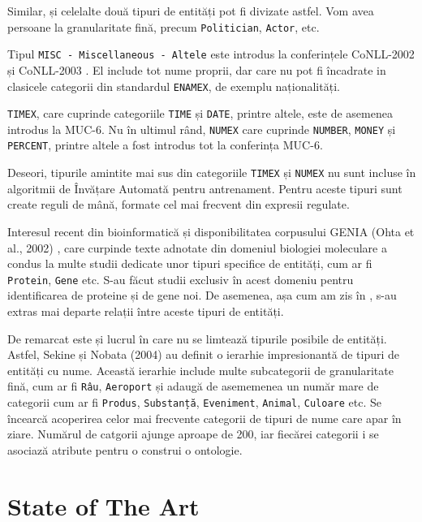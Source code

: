 Similar, și celelalte două tipuri de entități pot fi divizate astfel. Vom avea persoane la granularitate fină, precum \texttt{Politician}, \texttt{Actor}, etc.

Tipul \texttt{MISC - Miscellaneous - Altele} este introdus la conferințele CoNLL-2002 și CoNLL-2003 \cite{conll2003}. El include tot nume proprii, dar care nu pot fi încadrate in clasicele categorii din standardul \texttt{ENAMEX}, de exemplu naționalități.

\texttt{TIMEX}, care cuprinde categoriile \texttt{TIME} și \texttt{DATE}, printre altele, este de asemenea introdus la MUC-6. Nu în ultimul rând, \texttt{NUMEX} care cuprinde \texttt{NUMBER}, \texttt{MONEY} și \texttt{PERCENT}, printre altele a fost introdus tot la conferința MUC-6.

Deseori, tipurile amintite mai sus din categoriile \texttt{TIMEX} și \texttt{NUMEX} nu sunt incluse în algoritmii de Învățare Automată pentru antrenament. Pentru aceste tipuri sunt create reguli de mână, formate cel mai frecvent din expresii regulate.


Interesul recent din bioinformatică și disponibilitatea corpusului GENIA (Ohta et al., 2002) \cite{Ohta02thegenia}, care curpinde texte adnotate din domeniul biologiei moleculare a condus la multe studii dedicate unor tipuri specifice de entități, cum ar fi \texttt{Protein}, \texttt{Gene} etc. S-au făcut studii exclusiv în acest domeniu pentru identificarea de proteine și de gene noi. De asemenea, așa cum am zis în , s-au extras mai departe relații între aceste tipuri de entități.


De remarcat este și lucrul în care nu se limtează tipurile posibile de entități. Astfel, Sekine și Nobata (2004) au definit o ierarhie impresionantă de tipuri de entități cu nume. Această ierarhie include multe subcategorii de granularitate fină, cum ar fi \texttt{Râu}, \texttt{Aeroport} și adaugă de asememenea un număr mare de categorii cum ar fi \texttt{Produs}, \texttt{Substanță}, \texttt{Eveniment}, \texttt{Animal}, \texttt{Culoare} etc. Se încearcă acoperirea celor mai frecvente categorii de tipuri de nume care apar în ziare. Numărul de catgorii ajunge aproape de 200, iar fiecărei categorii i se asociază atribute pentru o construi o ontologie. \cite{sekine2004}

\section{State of The Art}













